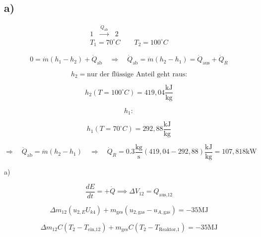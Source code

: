 

\subsection*{a)}

\begin{equation*}
\begin{array}{c}
\text{1} \quad \xrightarrow{Q_{\text{ab}}} \quad \text{2} \\
T_1 = 70^\circ C \quad \quad T_2 = 100^\circ C
\end{array}
\end{equation*}

\begin{equation*}
0 = \dot{m}(h_1 - h_2) + \dot{Q}_{\text{ab}} \quad \Rightarrow \quad \dot{Q}_{\text{ab}} = \dot{m}(h_2 - h_1) = \dot{Q}_{\text{aus}} + \dot{Q}_R
\end{equation*}

\begin{equation*}
h_2 = \text{nur der flüssige Anteil geht raus:}
\end{equation*}

\begin{equation*}
h_2(T = 100^\circ C) = 419,04 \frac{\text{kJ}}{\text{kg}}
\end{equation*}

\begin{equation*}
h_1:
\end{equation*}

\begin{equation*}
h_1(T = 70^\circ C) = 292,88 \frac{\text{kJ}}{\text{kg}}
\end{equation*}

\begin{equation*}
\Rightarrow \quad \dot{Q}_{\text{ab}} = \dot{m}(h_2 - h_1) \quad \Rightarrow \quad \dot{Q}_R = 0.3 \frac{\text{kg}}{\text{s}} (419,04 - 292,88) \frac{\text{kJ}}{\text{kg}} = 107,818 \text{kW}
\end{equation*}

a)

\[
\frac{dE}{dt} = + \dot{Q} \implies \Delta V_{12} = Q_{\text{aus,12}}
\]

\[
\Delta m_{12} \left( u_{2,E} U_{k4} \right) + m_{\text{ges}} \left( u_{2,\text{gas}} - u_{A,\text{gas}} \right) = -35 \text{MJ}
\]

\[
\Delta m_{12} C \left( T_2 - T_{\text{ein,12}} \right) + m_{\text{ges}} C \left( T_2 - T_{\text{Reaktor,1}} \right) = -35 \text{MJ}
\]

